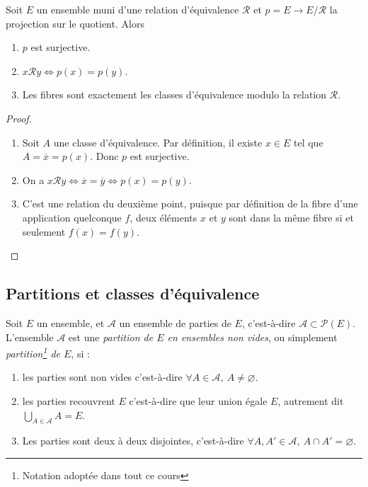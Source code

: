 \begin{proposition}
Soit $E$ un ensemble muni d'une relation d'équivalence ${\mathcal R}$ et $p = E\to E/\mathcal R$ la projection sur le quotient. Alors 
\begin{enumerate}
\item $p$ est surjective.
\item $x\mathcal R y \iff p(x)=p(y)$.
\item Les fibres sont exactement les classes d'équivalence modulo la relation $\mathcal R$.
\end{enumerate}
\end{proposition}
\begin{proof}
\begin{enumerate}
\item Soit $A$ une classe d'équivalence. Par définition, il existe $x\in E$ tel que $A = \overline{x} = p(x)$. Donc $p$ est surjective.
\item On a $x\mathcal R y \iff \overline{x} = \overline{y} \iff p(x)=p(y)$.
\item C'est une relation du deuxième point, puisque par définition de la fibre d'une application quelconque $f$, deux éléments $x$ et $y$ sont dans la même fibre si et seulement $f(x)=f(y)$.
\end{enumerate}
\end{proof}




\subsection{Partitions et classes d'équivalence}

\begin{definition}
Soit $E$ un ensemble, et $\mathcal A$ un ensemble de parties de $E$, c'est-à-dire $\mathcal A\subset \mathcal P(E)$. L'ensemble $\mathcal A$ est une \emph{partition de $E$ en ensembles non vides}, ou simplement \emph{partition\footnote{Notation adoptée dans tout ce cours} de $E$}, si : 
\begin{enumerate}
\item les parties sont non vides c'est-à-dire $\forall A\in \mathcal A, \: A\neq \varnothing$.
\item les parties recouvrent $E$ c'est-à-dire que leur union égale $E$, autrement dit $\bigcup_{A\in \mathcal A} A = E$.
\item Les parties sont deux à deux disjointes, c'est-à-dire $\forall A, A' \in \mathcal A, \: A\cap A' = \varnothing$.
\end{enumerate}
\end{definition}

